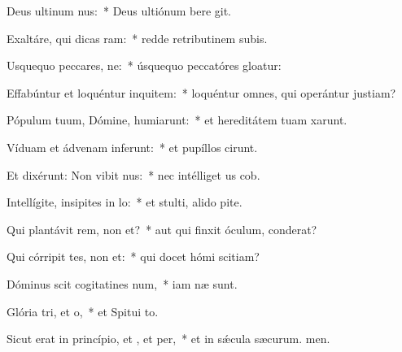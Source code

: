 \item Deus ultinum nus:~* Deus ultiónum bere git.
\item Exaltáre, qui dicas ram:~* redde retributinem subis.
\item Usquequo peccares, ne:~* úsquequo peccatóres gloatur:
\item Effabúntur et loquéntur inquitem:~* loquéntur omnes, qui operántur justiam?
\item Pópulum tuum, Dómine, humiarunt:~* et hereditátem tuam xarunt.
\item Víduam et ádvenam inferunt:~* et pupíllos cirunt.
\item Et dixérunt: Non vibit nus:~* nec intélliget us cob.
\item Intellígite, insipites in lo:~* et stulti, alido pite.
\item Qui plantávit rem, non et?~* aut qui finxit óculum,  conderat?
\item Qui córripit tes, non et:~* qui docet hómi scitiam?
\item Dóminus scit cogitatines num,~* iam næ sunt.
\item Glória tri, et o,~* et Spitui to.
\item Sicut erat in princípio, et , et per,~* et in sǽcula sæcurum. men.
